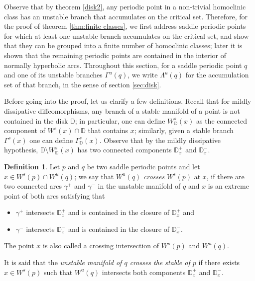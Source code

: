 \documentclass[a4paper,11pt]{article}
\theoremstyle{definition}
\newtheorem{definition}[lemma]{Definition}
\def\DD{{\mathbb D}}
\def\La{\Lambda}
\def\ga{\gamma}
\def\Ga{\Gamma}
\def\La{\Lambda}
\def\Ga{\Gamma}
\begin{document}
Observe that by theorem \ref{disk2}, any periodic point in a non-trivial homoclinic class has an unstable branch that accumulates on the critical set.  Therefore, 
for the proof of theorem \ref{thm:finite classes}, we first address saddle periodic points for which at least one unstable branch accumulates on the critical set, and show that they can be grouped into a finite number of homoclinic classes; later it is shown that the remaining periodic points   are contained in the interior of   normally hyperbolic arcs. Throughout this section, for a saddle periodic point $q$ and one of its
unstable branches $\Ga^u(q)$, we write $\La^u(q)$ for the accumulation set
of that branch, in the sense of section \ref{sec:disk}.

Before going  into the proof, let us clarify a few definitions. Recall that for mildly dissipative diffeomorphisms, any branch of a stable manifold of a point is not contained in the disk $\DD$; in particular, one can define $W^s_\DD(x)$ as the connected component of $W^s(x)\cap \DD$ that contains $x$; similarly, given a stable branch $\Ga^s(x)$ one can define $\Ga^s_\DD(x).$ Observe that by the mildly dissipative hypothesis, $\DD\setminus W^s_\DD(x)$ has two connected components $\DD^+_x$ and $\DD^-_x$. 

\begin{definition}\label{defi:crossing} Let $p$ and $q$ be two saddle periodic points and let $x\in W^s(p)\cap W^u(q)$; we say that $W^u(q)$ {\it crosses} $W^s(p)$ at $x$,  if there are two connected arcs $\ga^+$ and $\ga^-$ in the unstable manifold of $q$ and $x$ is an extreme point of both arcs satisfying that 

\begin{itemize}
    \item[--] $\ga^+$ intersects $\DD^+_x$ and is contained in the closure of  $\DD^+_x$ and 
    \item[--] $\ga^-$ intersects $\DD^-_x$ and is contained in the closure of  $\DD^-_x.$
    
\end{itemize}

The point $x$  is also called a crossing intersection of $W^s(p)$ and $W^u(q).$

It is said that the {\it unstable manifold of $q$ crosses the stable of $p$} if there exists $x\in W^s(p)$ such that $W^u(q)$ intersects both components $\DD^+_x$ and $\DD^-_x.$
    
\end{definition}
\end{document}
